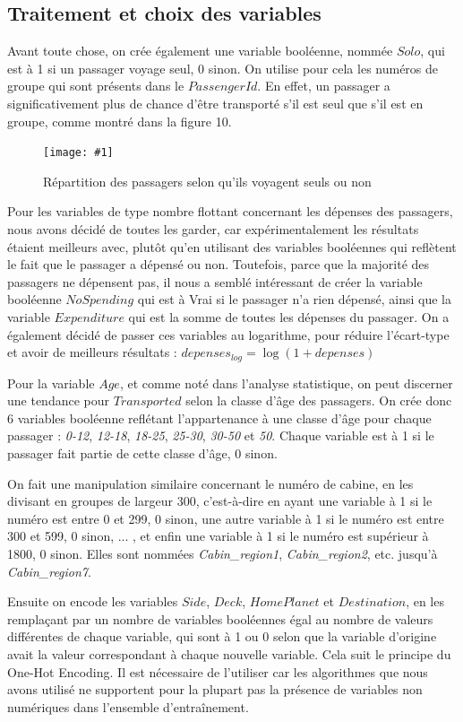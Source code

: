 \documentclass[a4paper]{article}
\newcommand{\illustration}[3]{
    \begin{figure}[h!]
        \centering
        \texttt{[image: \#1]}
        \caption{#2}
    \end{figure}
}
\begin{document}
    \subsection{Traitement et choix des variables}

    Avant toute chose, on crée également une variable booléenne, nommée $Solo$, qui est à 1 si un passager voyage seul, 0 sinon. 
    On utilise pour cela les numéros de groupe qui sont présents dans le $PassengerId$. En effet, un passager a significativement plus de chance d'être
    transporté s'il est seul que s'il est en groupe, comme montré dans la figure 10.

    \illustration{images/Figure 8.png}{Répartition des passagers selon qu'ils voyagent seuls ou non}{8cm}

    Pour les variables de type nombre flottant concernant les dépenses des passagers, nous avons décidé de toutes les garder, car expérimentalement
    les résultats étaient meilleurs avec, plutôt qu'en utilisant des variables booléennes qui reflètent le fait que le passager a dépensé ou non.
    Toutefois, parce que la majorité des passagers ne dépensent pas, il nous a semblé intéressant de créer la variable booléenne $NoSpending$
    qui est à Vrai si le passager n'a rien dépensé, ainsi que la variable $Expenditure$ qui est la somme de toutes les dépenses du passager.
    On a également décidé de passer ces variables au logarithme, pour réduire l'écart-type et avoir de meilleurs résultats : $depenses_{log} = \log{(1+depenses)}$

    Pour la variable $Age$, et comme noté dans l'analyse statistique, on peut discerner une tendance pour $Transported$ selon la classe d'âge
    des passagers. On crée donc 6 variables booléenne reflétant l'appartenance à une classe d'âge pour chaque passager : \textit{0-12}, \textit{12-18}, \textit{18-25}, 
    \textit{25-30}, \textit{30-50} et \textit{50}.
    Chaque variable est à 1 si le passager fait partie de cette classe d'âge, 0 sinon. 

    On fait une manipulation similaire concernant le numéro de cabine, en les divisant en groupes de largeur 300, c'est-à-dire en ayant une variable
    à 1 si le numéro est entre 0 et 299, 0 sinon, une autre variable à 1 si le numéro est entre 300 et 599, 0 sinon, ... , et enfin une variable à 1 si le numéro 
    est supérieur à 1800, 0 sinon. Elles sont nommées {\it Cabin\_region1}, {\it Cabin\_region2}, etc. jusqu'à {\it Cabin\_region7}.

    Ensuite on encode les variables $Side$, $Deck$, $HomePlanet$ et $Destination$, en les remplaçant par un nombre de variables booléennes égal au nombre
    de valeurs différentes de chaque variable, qui sont à 1 ou 0 selon que la variable d'origine avait la valeur correspondant à chaque nouvelle variable.
    Cela suit le principe du One-Hot Encoding. Il est nécessaire de l'utiliser car les algorithmes que nous avons utilisé ne supportent pour la plupart pas
    la présence de variables non numériques dans l'ensemble d'entraînement.
\end{document}

